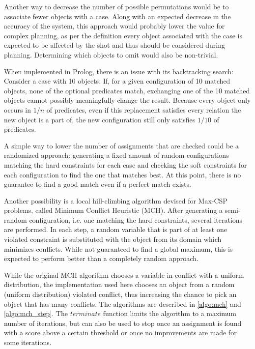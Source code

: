 Another way to decrease the number of possible permutations would be to associate fewer objects with a case. 
Along with an expected decrease in the accuracy of the system, this approach would probably lower the value for complex planning, as per the definition every object associated with the case is expected to be affected by the shot and thus should be considered during planning.
Determining which objects to omit would also be non-trivial.

When implemented in Prolog, there is an issue with its backtracking search: Consider a case with 10 objects: If, for a given configuration of 10 matched objects, none of the optional predicates match, exchanging one of the 10 matched objects cannot possibly meaningfully change the result.
Because every object only occurs in $1/n$ of predicates, even if this replacement satisfies every relation the new object is a part of, the new configuration still only satisfies $1/10$ of predicates.

A simple way to lower the number of assignments that are checked could be a randomized approach: generating a fixed amount of random configurations matching the hard constraints for each case and checking the soft constraints for each configuration to find the one that matches best.
At this point, there is no guarantee to find a good match even if a perfect match exists. 

Another possibility is a local hill-climbing algorithm devised for Max-CSP problems, called Minimum Conflict Heuristic (MCH)\cite{Minton1992MinimizingCA}. After generating a semi-random configuration, i.e. one matching the hard constraints, several iterations are performed. 
In each step, a random variable that is part of at least one violated constraint is substituted with the object from its domain which minimizes conflicts. 
While not guaranteed to find a global maximum, this is expected to perform better than a completely random approach.

While the original MCH algorithm chooses a variable in conflict with a uniform distribution, the implementation used here chooses an object from a random (uniform distribution) violated conflict, thus increasing the chance to pick an object that has many conflicts. The algorithms are described in \ref{algo:mch} and \ref{algo:mch_step}.
The $terminate$ function limits the algorithm to a maximum number of iterations, but can also be used to stop once an assignment is found with a score above a certain threshold or once no improvements are made for some iterations.

